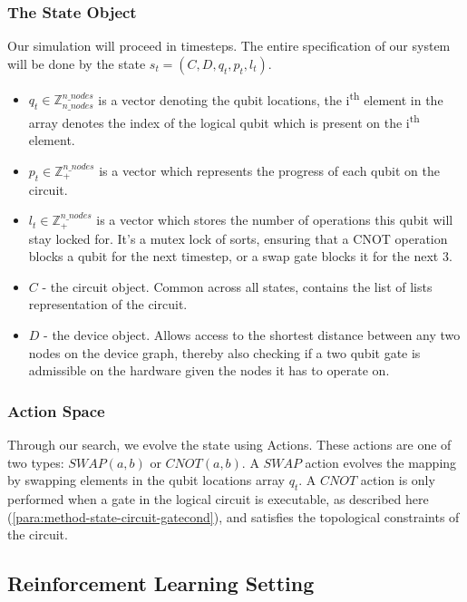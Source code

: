 \documentclass[%
 reprint,
 amsmath,amssymb,
 aps,
]{revtex4-2}
\begin{document}
\subsubsection{\label{sec:method-state-full}The State Object}

Our simulation will proceed in timesteps. The entire specification of our system will be done by the state $s_t = (C, D, q_t, p_t, l_t)$.
\begin{itemize}
    \item $q_t \in \mathbb{Z}^{n\_nodes}_{n\_nodes}$ is a vector denoting the qubit locations, the i\textsuperscript{th} element in the array denotes the index of the logical qubit which is present on the i\textsuperscript{th} element.
    \item $p_t \in \mathbb{Z}^{n\_nodes}_{+}$ is a vector which represents the progress of each qubit on the circuit.
    \item $l_t \in \mathbb{Z}^{n\_nodes}_{+}$ is a vector which stores the number of operations this qubit will stay locked for. It's a mutex lock of sorts, ensuring that a CNOT operation blocks a qubit for the next timestep, or a swap gate blocks it for the next 3.
    \item $C$ - the circuit object. Common across all states, contains the list of lists representation of the circuit.
    \item $D$ - the device object. Allows access to the shortest distance between any two nodes on the device graph, thereby also checking if a two qubit gate is admissible on the hardware given the nodes it has to operate on.
\end{itemize}

\subsubsection{\label{sec:method-state-actions}Action Space}

Through our search, we evolve the state using Actions. These actions are one of two types: $SWAP(a, b)$ or $CNOT(a, b)$. A $SWAP$ action evolves the mapping by swapping elements in the qubit locations array $q_t$. A $CNOT$ action is only performed when a gate in the logical circuit is executable, as described here (\ref{para:method-state-circuit-gatecond}), and satisfies the topological constraints of the circuit.

\subsection{\label{sec:method-rl}Reinforcement Learning Setting}
\end{document}
